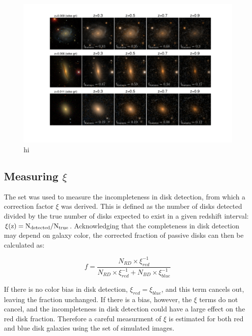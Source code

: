 \documentclass[useAMS,usenatbib]{mn2e}
\begin{document}
\begin{figure}
\centering
\includegraphics[width=\textwidth,trim={.5cm 3cm .5cm .5cm},clip]{figures/ferengi2_examples_with_fractions.pdf}
\caption{hi}
\label{fig:ferengi2example}
\end{figure}

\subsection{Measuring $\xi$}
\label{ssec:xi}

The  set was used to measure the incompleteness in disk detection, from which a correction factor $\xi$ was derived. This is defined as the number of disks detected divided by the true number of disks expected to exist in a given redshift interval: $\rm \xi(z)=N_{detected}/N_{true}$. Acknowledging that the completeness in disk detection may depend on galaxy color, the corrected fraction of passive disks can then be calculated as:

\begin{equation}
f=\frac{N_{RD}\times \xi^{-1}_{red}}{N_{RD}\times \xi^{-1}_{red} + N_{BD} \times \xi^{-1}_{blue}}
\label{eqn:reddiskfraction}
\end{equation}

If there is no color bias in disk detection, $\xi_{red}=\xi_{blue}$, and this term cancels out, leaving the fraction unchanged. If there is a bias, however, the $\xi$ terms do not cancel, and the incompleteness in disk detection could have a large effect on the red disk fraction. Therefore a careful measurment of $\xi$ is estimated for both red and blue disk galaxies using the  set of simulated images.
\end{document}

